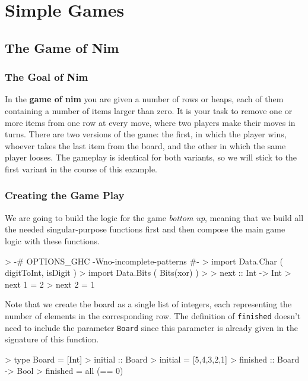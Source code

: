 \chapter{Simple Games}

\section{The Game of Nim}

\subsection{The Goal of Nim}

In the \textbf{game of nim} you are given a number of rows or heaps, each of them containing a number of items larger than zero. 
It is your task to remove one or more items from one row at every move, where two players make their moves in turns.
There are two versions of the game: the first, in which the player wins, whoever takes the last item from the board, and the other in which the same player looses.
The gameplay is identical for both variants, so we will stick to the first variant in the course of this example.

\subsection{Creating the Game Play}

We are going to build the logic for the game \emph{bottom up}, meaning that we build all the needed singular-purpose functions first and then compose the main game logic with these functions.

\begin{impl}
\end{impl}
\begin{haskellcode}

> {-# OPTIONS_GHC -Wno-incomplete-patterns #-}
> import Data.Char ( digitToInt, isDigit )
> import Data.Bits ( Bits(xor) )
> 
> next :: Int -> Int 
> next 1 = 2
> next 2 = 1

\end{haskellcode}

\begin{impl}
Note that we create the board as a single list of integers, each representing the number of elements in the corresponding row. The definition of \texttt{finished} doesn't need to include the parameter \texttt{Board} since this parameter is already given in the signature of this function.
\end{impl}
\begin{haskellcode}

> type Board = [Int]
> initial :: Board
> initial = [5,4,3,2,1]
> finished :: Board -> Bool
> finished = all (== 0)

\end{haskellcode}

